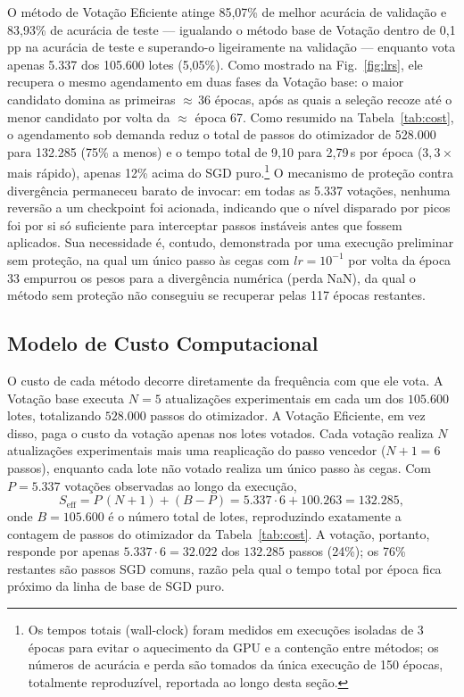 \documentclass[conference]{IEEEtran}
\begin{document}
O método de Votação Eficiente atinge 85,07\% de melhor acurácia de validação e 83,93\% de acurácia de teste --- igualando o método base de Votação dentro de 0,1 pp na acurácia de teste e superando-o ligeiramente na validação --- enquanto vota apenas 5{.}337 dos 105{.}600 lotes (5,05\%). Como mostrado na Fig.~\ref{fig:lrs}, ele recupera o mesmo agendamento em duas fases da Votação base: o maior candidato domina as primeiras ${\approx}\,36$ épocas, após as quais a seleção recoze até o menor candidato por volta da ${\approx}$ época 67. Como resumido na Tabela~\ref{tab:cost}, o agendamento sob demanda reduz o total de passos do otimizador de 528{.}000 para 132{.}285 (75\% a menos) e o tempo total de 9,10 para 2,79\,s por época ($3,3\times$ mais rápido), apenas 12\% acima do SGD puro.\footnote{Os tempos totais (wall-clock) foram medidos em execuções isoladas de 3 épocas para evitar o aquecimento da GPU e a contenção entre métodos; os números de acurácia e perda são tomados da única execução de 150 épocas, totalmente reproduzível, reportada ao longo desta seção.} O mecanismo de proteção contra divergência permaneceu barato de invocar: em todas as 5{.}337 votações, nenhuma reversão a um checkpoint foi acionada, indicando que o nível disparado por picos foi por si só suficiente para interceptar passos instáveis antes que fossem aplicados. Sua necessidade é, contudo, demonstrada por uma execução preliminar sem proteção, na qual um único passo às cegas com $lr = 10^{-1}$ por volta da época 33 empurrou os pesos para a divergência numérica (perda NaN), da qual o método sem proteção não conseguiu se recuperar pelas 117 épocas restantes.

\subsection{Modelo de Custo Computacional}
\label{sec:cost}

O custo de cada método decorre diretamente da frequência com que ele vota. A Votação base executa $N = 5$ atualizações experimentais em cada um dos $105{.}600$ lotes, totalizando $528{.}000$ passos do otimizador. A Votação Eficiente, em vez disso, paga o custo da votação apenas nos lotes votados. Cada votação realiza $N$ atualizações experimentais mais uma reaplicação do passo vencedor ($N + 1 = 6$ passos), enquanto cada lote não votado realiza um único passo às cegas. Com $P = 5{.}337$ votações observadas ao longo da execução,
\begin{equation}
S_{\mathrm{eff}} = P\,(N+1) + (B - P) = 5{.}337 \cdot 6 + 100{.}263 = 132{.}285,
\label{eq:cost}
\end{equation}
onde $B = 105{.}600$ é o número total de lotes, reproduzindo exatamente a contagem de passos do otimizador da Tabela~\ref{tab:cost}. A votação, portanto, responde por apenas $5{.}337 \cdot 6 = 32{.}022$ dos $132{.}285$ passos (24\%); os 76\% restantes são passos SGD comuns, razão pela qual o tempo total por época fica próximo da linha de base de SGD puro.
\end{document}
